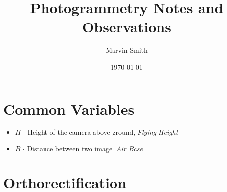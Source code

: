 \documentclass[12pt]{report}
\title{Photogrammetry Notes and Observations}
\author{Marvin Smith}
\date{\today}
\begin{document}
\maketitle

\tableofcontents
\clearpage



\chapter*{Common Variables}

\begin{itemize}
\item $H$ - Height of the camera above ground, \emph{Flying Height}
\item $B$ - Distance between two image, \emph{Air Base}
\end{itemize}


\chapter*{Orthorectification}


\glsaddall
\printglossary




\nocite{*}

\printindex
\end{document}
